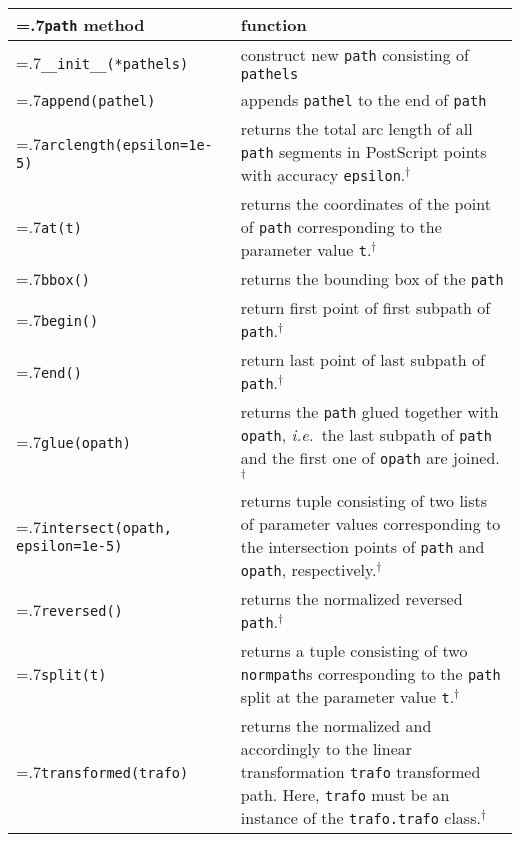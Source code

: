 \medskip
\begin{tabularx}{\linewidth}{>{\hsize=.7\hsize}X>{\raggedright\arraybackslash\hsize=1.3\hsize}X}
  \texttt{path} method & function \\
  \hline \texttt{\_\_init\_\_(*pathels)} & construct new \texttt{path}
  consisting of \texttt{pathels}\\
  \texttt{append(pathel)} & appends \texttt{pathel} to the end of 
  \texttt{path}\\
  \texttt{arclength(epsilon=1e-5)} & returns the total arc length of
  all \texttt{path} segments in PostScript points with accuracy
  \texttt{epsilon}.$^\dagger$\\
  \texttt{at(t)} & returns the coordinates of the point of
  \texttt{path} corresponding to the parameter value
  \texttt{t}.$^\dagger$\\
  \texttt{bbox()} & returns the bounding box of the \texttt{path}\\
  \texttt{begin()} & return first point of first subpath of
  \texttt{path}.$^\dagger$\\
  \texttt{end()} & return last point of last subpath of
  \texttt{path}.$^\dagger$\\
  \texttt{glue(opath)} & returns the \texttt{path} glued together with
  \texttt{opath}, \textit{i.e.}\ the last subpath of \texttt{path}
  and the first one of \texttt{opath} are joined.$^\dagger$\\
  \texttt{intersect(opath, \newline\phantom{intersect(}epsilon=1e-5)}
  & returns tuple consisting of two lists of parameter values
  corresponding to the
  intersection points of \texttt{path} and \texttt{opath}, respectively.$^\dagger$\\
  \texttt{reversed()} & returns the normalized reversed
  \texttt{path}.$^\dagger$\\
  \texttt{split(t)} & returns a tuple consisting of two
  \texttt{normpath}s corresponding to the \texttt{path} split at
  the parameter value \texttt{t}.$^\dagger$\\
  \texttt{transformed(trafo)} & returns the normalized and accordingly
  to the linear transformation \texttt{trafo} transformed path. Here,
  \texttt{trafo} must be an instance of the \texttt{trafo.trafo}
  class.$^\dagger$
\end{tabularx} 
\medskip

